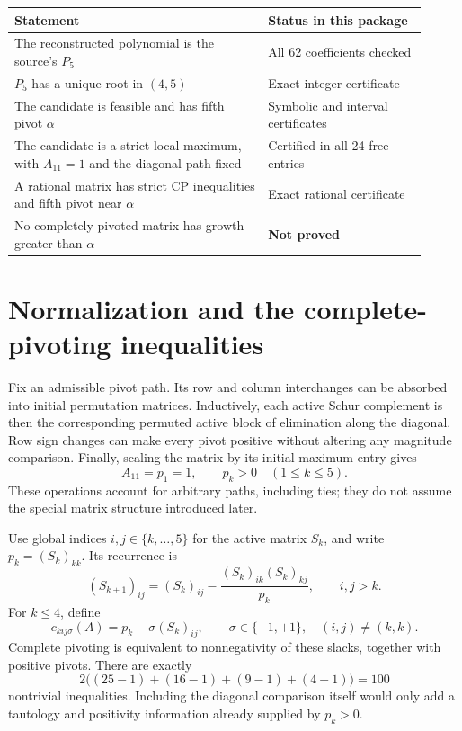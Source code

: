 \documentclass[11pt,letterpaper]{article}
\begin{document}
\begin{center}
\begin{tabular}{@{}p{0.56\linewidth}p{0.35\linewidth}@{}}
\toprule
Statement & Status in this package\\\midrule
The reconstructed polynomial is the source's $P_5$ & All 62 coefficients checked\\
$P_5$ has a unique root in $(4,5)$ & Exact integer certificate\\
The candidate is feasible and has fifth pivot $\alpha$ & Symbolic and interval certificates\\
The candidate is a strict local maximum, with $A_{11}=1$ and the diagonal path fixed & Certified in all 24 free entries\\
A rational matrix has strict CP inequalities and fifth pivot near $\alpha$ & Exact rational certificate\\
No completely pivoted matrix has growth greater than $\alpha$ & \textbf{Not proved}\\\bottomrule
\end{tabular}
\end{center}

\section{Normalization and the complete-pivoting inequalities}
Fix an admissible pivot path. Its row and column interchanges can be absorbed into initial permutation matrices. Inductively, each active Schur complement is then the corresponding permuted active block of elimination along the diagonal. Row sign changes can make every pivot positive without altering any magnitude comparison. Finally, scaling the matrix by its initial maximum entry gives
\[
 A_{11}=p_1=1,\qquad p_k>0\quad(1\le k\le5).
\]
These operations account for arbitrary paths, including ties; they do not assume the special matrix structure introduced later.

Use global indices $i,j\in\{k,\ldots,5\}$ for the active matrix $S_k$, and write $p_k=(S_k)_{kk}$. Its recurrence is
\begin{equation}\label{eq:schur}
 (S_{k+1})_{ij}=(S_k)_{ij}
       -\frac{(S_k)_{ik}(S_k)_{kj}}{p_k},\qquad i,j>k.
\end{equation}
For $k\le4$, define
\begin{equation}\label{eq:slack}
 c_{kij\sigma}(A)=p_k-\sigma(S_k)_{ij},
 \qquad \sigma\in\{-1,+1\},\quad(i,j)\ne(k,k).
\end{equation}
Complete pivoting is equivalent to nonnegativity of these slacks, together with positive pivots. There are exactly
\[
       2\bigl((25-1)+(16-1)+(9-1)+(4-1)\bigr)=100
\]
nontrivial inequalities. Including the diagonal comparison itself would only add a tautology and positivity information already supplied by $p_k>0$.
\end{document}
